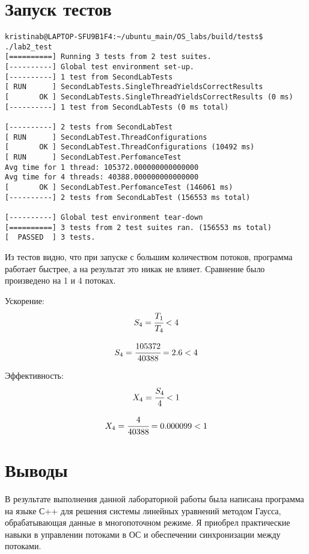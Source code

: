 \documentclass[a4paper, 12pt]{article}
\begin{document}
\section{Запуск тестов}
\begin{verbatim}
kristinab@LAPTOP-SFU9B1F4:~/ubuntu_main/OS_labs/build/tests$ ./lab2_test 
[==========] Running 3 tests from 2 test suites.
[----------] Global test environment set-up.
[----------] 1 test from SecondLabTests
[ RUN      ] SecondLabTests.SingleThreadYieldsCorrectResults
[       OK ] SecondLabTests.SingleThreadYieldsCorrectResults (0 ms)
[----------] 1 test from SecondLabTests (0 ms total)

[----------] 2 tests from SecondLabTest
[ RUN      ] SecondLabTest.ThreadConfigurations
[       OK ] SecondLabTest.ThreadConfigurations (10492 ms)
[ RUN      ] SecondLabTest.PerfomanceTest
Avg time for 1 thread: 105372.000000000000000
Avg time for 4 threads: 40388.000000000000000
[       OK ] SecondLabTest.PerfomanceTest (146061 ms)
[----------] 2 tests from SecondLabTest (156553 ms total)

[----------] Global test environment tear-down
[==========] 3 tests from 2 test suites ran. (156553 ms total)
[  PASSED  ] 3 tests.
\end{verbatim}
Из тестов видно, что при запуске с большим количеством потоков, программа работает быстрее, а на результат это никак не влияет. Сравнение было произведено на 1 и 4 потоках.

Ускорение:
\begin{equation}
  S_4 = \cfrac{T_1}{T_4} < 4
\end{equation}

\begin{equation}
    S_4 = \cfrac{105372}{40388} = 2.6 < 4
\end{equation}

Эффективность:
\begin{equation}
  X_4 = \cfrac{S_4}{4} < 1
\end{equation}

\begin{equation}
  X_4 = \cfrac{4}{40388} = 0.000099 < 1
\end{equation}

\newpage
\section{Выводы}

В результате выполнения данной лабораторной работы была написана программа на языке С++ для решения системы линейных уравнений методом Гаусса, обрабатывающая данные в многопоточном режиме. Я приобрел практические навыки в управлении потоками в ОС и обеспечении синхронизации между потоками.
\end{document}

